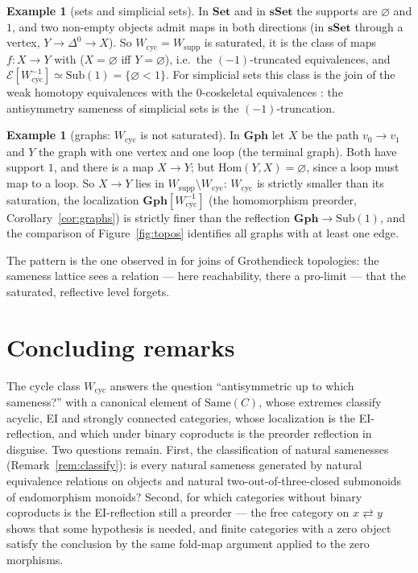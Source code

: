 \documentclass[11pt]{amsart}
\theoremstyle{definition}
\newtheorem{ex}[thm]{Example}
\newcommand{\Same}{\mathrm{Same}}
\newcommand{\Hom}{\mathrm{Hom}}
\newcommand{\Wcyc}{W_{\mathrm{cyc}}}
\newcommand{\Wsupp}{W_{\mathrm{supp}}}
\newcommand{\Set}{\mathbf{Set}}
\newcommand{\sSet}{\mathbf{sSet}}
\newcommand{\Sub}{\mathrm{Sub}}
\begin{document}
\begin{ex}[sets and simplicial sets]\label{ex:sset}
In $\Set$ and in $\sSet$ the supports are $\varnothing$ and $1$, and two
non-empty objects admit maps in both directions (in $\sSet$ through a
vertex, $Y\to\Delta^0\to X$). So $\Wcyc=\Wsupp$ is saturated, it is the class
of maps $f\colon X\to Y$ with ($X=\varnothing$ iff $Y=\varnothing$), i.e.\ the
$(-1)$-truncated equivalences, and $\mathcal E[\Wcyc^{-1}]\simeq\Sub(1)=\{\varnothing<1\}$.
For simplicial sets this class is the join of the weak homotopy
equivalences with the $0$-coskeletal equivalences \cite[Thm.~6.2, $n=-1$]{Postnikov}:
the antisymmetry sameness of simplicial sets is the $(-1)$-truncation.
\end{ex}

\begin{ex}[graphs: $\Wcyc$ is not saturated]\label{ex:graphs}
In $\mathbf{Gph}$ let $X$ be the path $v_0\to v_1$ and $Y$ the graph with one
vertex and one loop (the terminal graph). Both have support $1$, and there
is a map $X\to Y$; but $\Hom(Y,X)=\varnothing$, since a loop must map to a
loop. So $X\to Y$ lies in $\Wsupp\setminus\Wcyc$: $\Wcyc$ is strictly smaller
than its saturation, the localization $\mathbf{Gph}[\Wcyc^{-1}]$ (the
homomorphism preorder, Corollary~\ref{cor:graphs}) is strictly finer than
the reflection $\mathbf{Gph}\to\Sub(1)$, and the comparison of
Figure~\ref{fig:topos} identifies all graphs with at least one edge.
\end{ex}

The pattern is the one observed in \cite{Topjoin} for joins of Grothendieck
topologies: the sameness lattice sees a relation --- here reachability, there
a pro-limit --- that the saturated, reflective level forgets.

\section{Concluding remarks}

The cycle class $\Wcyc$ answers the question ``antisymmetric up to which
sameness?'' with a canonical element of $\Same(C)$, whose extremes classify
acyclic, EI and strongly connected categories, whose localization is the
EI-reflection, and which under binary coproducts is the preorder reflection
in disguise. Two questions remain. First, the classification of natural
samenesses (Remark~\ref{rem:classify}): is every natural sameness generated
by natural equivalence relations on objects and natural
two-out-of-three-closed submonoids of endomorphism monoids? Second, for
which categories without binary coproducts is the EI-reflection still a
preorder --- the free category on $x\rightleftarrows y$ shows that some
hypothesis is needed, and finite categories with a zero object satisfy the
conclusion by the same fold-map argument applied to the zero morphisms.
\end{document}
